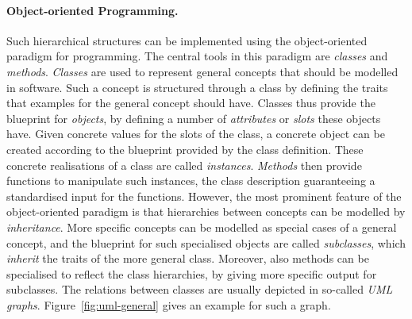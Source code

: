\paragraph{Object-oriented Programming.}

Such hierarchical structures 
can be implemented using the object-oriented paradigm for programming.
The central tools in this paradigm are \emph{classes} and \emph{methods}.
\emph{Classes} are used to represent general concepts that should be modelled in software.
Such a concept is structured through a class by defining the traits that
examples for the general concept should have. 
Classes thus provide the blueprint for \emph{objects},
by defining a number of \emph{attributes} or \emph{slots} these objects have.
Given concrete values for the slots of the class,
a concrete object can be created according to the blueprint provided by the class definition.
These concrete realisations of a class are called \emph{instances}.
\emph{Methods} then provide functions to manipulate such instances,
the class description guaranteeing a standardised input for the functions.
However, the most prominent feature of the object-oriented paradigm is
that hierarchies between concepts can be modelled by \emph{inheritance}.
More specific concepts can be modelled as special cases of a general concept, %
and the blueprint for such specialised objects are called \emph{subclasses},
which \emph{inherit} the traits of the more general class.
Moreover, also methods can be specialised to reflect the class hierarchies,
by giving more specific output for subclasses.
The relations between classes are usually depicted in so-called \emph{UML graphs}.
Figure~\ref{fig:uml-general} gives an example for such a graph.

